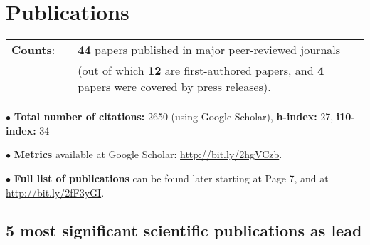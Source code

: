 \documentclass[11pt,letterpaper,sans]{moderncv}
\begin{document}
\vspace{-10mm}
\section{Publications}

\cvitem{}
{
\begin{tabular}{rcl}
\textbf{Counts}: &\hspace{0.3cm} &{\textbf{44} papers published in major peer-reviewed journals} \\
& &{(out of which \textbf{12} are first-authored papers, and \textbf{4} papers were covered by press releases).}
\end{tabular}
}

$\bullet$ \textbf{Total number of citations:} 2650 (using Google Scholar), \textbf{h-index:} 27, \textbf{i10-index:} 34

$\bullet$ \textbf{Metrics} available at Google Scholar: {\color{color1} \href{http://bit.ly/2hgVCzb}{http://bit.ly/2hgVCzb}}.

$\bullet$ \textbf{Full list of publications} can be found later starting at Page 7, and at {\color{color1} \href{http://bit.ly/2fF3yGI}{http://bit.ly/2fF3yGI}}.

\subsection{5 most significant scientific publications as lead}
\end{document}
